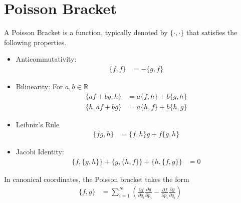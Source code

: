 \documentclass[book.tex]{subfiles}
\begin{document}
\section{Poisson Bracket}
A Poisson Bracket is a function, typically denoted by $\{\cdot, \cdot \}$ that satisfies the following properties.

\begin{itemize}
\item Anticommutativity: 
\begin{align}
\{f, f\} &= - \{g, f\}
\end{align}
\item Bilinearity: For $a, b \in \mathbb{R}$
\begin{align}
\{af + bg, h\} &= a\{f, h\} + b \{g, h\}\\
\{h, af + bg\} &= a\{h, f\} + b \{h, g\}
\end{align}
\item Leibniz's Rule
\begin{align}
\{fg, h\} &= \{f, h\}g + f\{g, h\} 
\end{align}
\item Jacobi Identity:
\begin{align}
\{f, \{g, h\}\} + \{g, \{h, f\}\} + \{h, \{f, g\}\} &= 0
\end{align}
\end{itemize}

In canonical coordinates, the Poisson bracket takes the form
\begin{align}
\{f, g\} &= \sum_{i=1}^N \left ( \frac{\partial f}{\partial q_i}\frac{\partial g}{\partial p_i} - \frac{\partial f}{\partial p_i} \frac{\partial g}{\partial q_i} \right )
\end{align}
\end{document}
